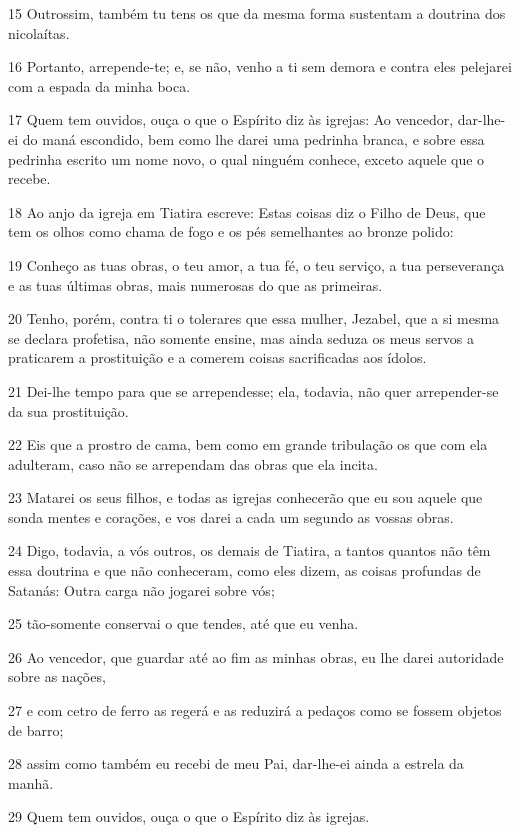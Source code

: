 \par 15 Outrossim, também tu tens os que da mesma forma sustentam a doutrina dos nicolaítas.
\par 16 Portanto, arrepende-te; e, se não, venho a ti sem demora e contra eles pelejarei com a espada da minha boca.
\par 17 Quem tem ouvidos, ouça o que o Espírito diz às igrejas: Ao vencedor, dar-lhe-ei do maná escondido, bem como lhe darei uma pedrinha branca, e sobre essa pedrinha escrito um nome novo, o qual ninguém conhece, exceto aquele que o recebe.
\par 18 Ao anjo da igreja em Tiatira escreve: Estas coisas diz o Filho de Deus, que tem os olhos como chama de fogo e os pés semelhantes ao bronze polido:
\par 19 Conheço as tuas obras, o teu amor, a tua fé, o teu serviço, a tua perseverança e as tuas últimas obras, mais numerosas do que as primeiras.
\par 20 Tenho, porém, contra ti o tolerares que essa mulher, Jezabel, que a si mesma se declara profetisa, não somente ensine, mas ainda seduza os meus servos a praticarem a prostituição e a comerem coisas sacrificadas aos ídolos.
\par 21 Dei-lhe tempo para que se arrependesse; ela, todavia, não quer arrepender-se da sua prostituição.
\par 22 Eis que a prostro de cama, bem como em grande tribulação os que com ela adulteram, caso não se arrependam das obras que ela incita.
\par 23 Matarei os seus filhos, e todas as igrejas conhecerão que eu sou aquele que sonda mentes e corações, e vos darei a cada um segundo as vossas obras.
\par 24 Digo, todavia, a vós outros, os demais de Tiatira, a tantos quantos não têm essa doutrina e que não conheceram, como eles dizem, as coisas profundas de Satanás: Outra carga não jogarei sobre vós;
\par 25 tão-somente conservai o que tendes, até que eu venha.
\par 26 Ao vencedor, que guardar até ao fim as minhas obras, eu lhe darei autoridade sobre as nações,
\par 27 e com cetro de ferro as regerá e as reduzirá a pedaços como se fossem objetos de barro;
\par 28 assim como também eu recebi de meu Pai, dar-lhe-ei ainda a estrela da manhã.
\par 29 Quem tem ouvidos, ouça o que o Espírito diz às igrejas.

